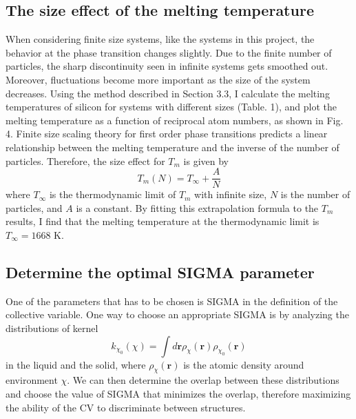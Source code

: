 \documentclass{article}
\begin{document}
\subsection{The size effect of the melting temperature}

When considering finite size systems, like the systems in this project, the behavior at the phase transition changes slightly. Due to the finite number of particles, the sharp discontinuity seen in infinite systems gets smoothed out. Moreover, fluctuations become more important as the size of the system decreases. Using the method described in Section 3.3, I calculate the melting temperatures of silicon for systems with different sizes (Table. 1), and plot the melting temperature as a function of reciprocal atom numbers, as shown in Fig. 4. Finite size scaling theory for first order phase transitions predicts a linear relationship between the melting temperature and the inverse of the number of particles. Therefore, the size effect for $T_m$ is given by
\begin{equation}
    T_m(N) = T_{\infty} + \frac{A}{N}
\end{equation}
where $T_{\infty}$ is the thermodynamic limit of $T_m$ with infinite size, $N$ is the number of particles, and $A$ is a constant. By fitting this extrapolation formula to the $T_m$ results, I find that the melting temperature at the thermodynamic limit is $T_{\infty} = 1668$ K.

\subsection{Determine the optimal SIGMA parameter}
One of the parameters that has to be chosen is SIGMA in the definition of the collective variable. One way to choose an appropriate SIGMA is by analyzing the distributions of kernel
\begin{equation}
    k_{\chi_0}(\chi)=\int d \mathbf{r} \rho_\chi(\mathbf{r}) \rho_{\chi_0}(\mathbf{r})
\end{equation}
in the liquid and the solid, where $\rho_\chi(\mathbf{r})$ is the atomic density around environment $\chi$. We can then determine the overlap between these distributions and choose the value of SIGMA that minimizes the overlap, therefore maximizing the ability of the CV to discriminate between structures. 
\end{document}
